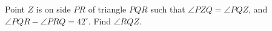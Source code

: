 Point $Z$ is on side $\overline{PR}$ of triangle $PQR$ such that $\angle PZQ=\angle PQZ$, and $\angle PQR-\angle PRQ=42^\circ$. Find $\angle RQZ$.
